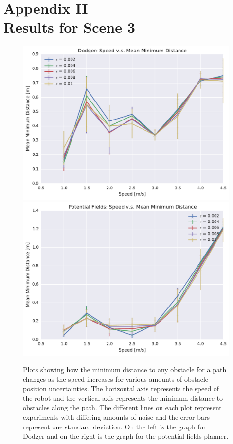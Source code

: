 \chapter*{Appendix II\\Results for Scene 3}

\begin{figure}[h!]
    \centering
    \includegraphics[width=0.48\linewidth]{figs/planner_mean_min_distance_2}
    \includegraphics[width=0.48\linewidth]{figs/pf_mean_min_distance_2}

    \caption{Plots showing how the minimum distance to any obstacle for a path
        changes as the speed increases for various amounts of obstacle position
        uncertainties.  The horizontal axis represents the speed of the robot
        and the vertical axis represents the minimum distance to obstacles
        along the path. The different lines on each plot represent experiments
    with differing amounts of noise and the error bars represent one standard
deviation. On the left is the graph for Dodger and on the right is the graph
for the potential fields planner.}

\end{figure}

